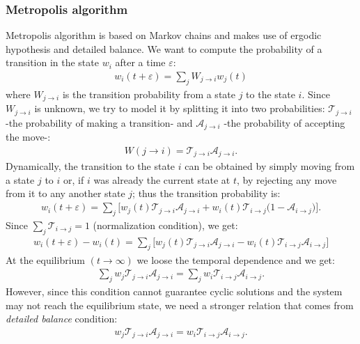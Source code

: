 \documentclass[%
 reprint,
 amsmath,amssymb,
 aps,
]{revtex4-1}
\theoremstyle{plain}
\theoremstyle{definition}
\theoremstyle{plain}
\begin{document}
	\subsubsection*{\textbf{Metropolis algorithm}}
	Metropolis algorithm is based on Markov chains and makes use of ergodic hypothesis and detailed balance.
	We want to compute the probability of a transition in the state $w_i$ after a time $\varepsilon$:
	\begin{align*}
	w_i(t+\varepsilon) = \sum_j W_{j\rightarrow i} w_j(t)
	\end{align*} 
	where $W_{j\rightarrow i}$ is the transition probability from a state $j$ to the state $i$. Since $W_{j\rightarrow i}$ is unknown, we try to model it by splitting it into two probabilities: $\mathscr{T}_{j\rightarrow i}$ -the probability of making a transition- and $\mathscr{A}_{j\rightarrow i}$ -the probability of accepting the move-:
	\begin{align*}
	W(j\rightarrow i)=\mathscr{T}_{j\rightarrow i}\mathscr{A}_{j\rightarrow i}.
	\end{align*}
	Dynamically, the transition to the state $i$ can be obtained by simply moving from a state $j$ to $i$ or, if $i$ was already the current state at $t$, by rejecting any move from it to any another state $j$; thus the transition probability is:
	\begin{align*}
	w_i(t+\varepsilon) = \sum_j\big[ w_j(t)\mathscr{T}_{j\rightarrow i}\mathscr{A}_{j\rightarrow i} + w_i(t)\mathscr{T}_{i\rightarrow j}\big(1-\mathscr{A}_{i\rightarrow j}\big) \big].
	\end{align*}
	Since $\sum_j \mathscr{T}_{i\rightarrow j} = 1$ (normalization condition), we get:
	\begin{align*}
	w_i(t+\varepsilon)-w_i(t)=  \sum_j\big[ w_j(t)\mathscr{T}_{j\rightarrow i}\mathscr{A}_{j\rightarrow i} - w_i(t)\mathscr{T}_{i \rightarrow j}\mathscr{A}_{i \rightarrow j} \big]
	\end{align*}
	At the equilibrium $(t\rightarrow\infty)$ we loose the temporal dependence and we get:
	\begin{align*}
	\sum_j w_j\mathscr{T}_{j\rightarrow i}\mathscr{A}_{j\rightarrow i} = \sum_j w_i\mathscr{T}_{i \rightarrow j}\mathscr{A}_{i \rightarrow j}.
	\end{align*}
	However, since this condition cannot guarantee cyclic solutions and the system may not reach the equilibrium state, we need a stronger relation that comes from \textit{detailed balance} condition:
	\begin{align*}
	w_j\mathscr{T}_{j\rightarrow i}\mathscr{A}_{j\rightarrow i} =  w_i\mathscr{T}_{i \rightarrow j}\mathscr{A}_{i \rightarrow j}.
	\end{align*} 
\end{document}
